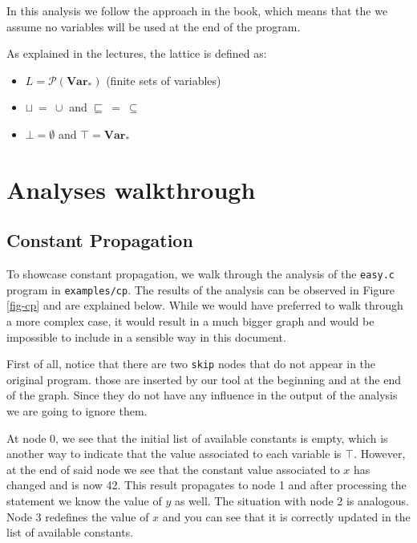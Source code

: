 \documentclass{article}
\begin{document}
In this analysis we follow the approach in the book, which means that the we assume no variables will be used at the end of the program.

As explained in the lectures, the lattice is defined as:

\begin{itemize}
	\item $L = \mathcal{P}(\mathbf{Var_*})$ (finite sets of variables)
	\item $\sqcup\ =\ \cup$ and $\sqsubseteq\ =\ \subseteq$
	\item $\bot = \emptyset$ and $\top = \mathbf{Var_*}$
\end{itemize}

\section{Analyses walkthrough}

\subsection*{Constant Propagation}

To showcase constant propagation, we walk through the analysis of the \texttt{easy.c} program in \texttt{examples/cp}. The results of the analysis can be observed in Figure \ref{fig-cp} and are explained below. While we would have preferred to walk through a more complex case, it would result in a much bigger graph and would be impossible to include in a sensible way in this document.

First of all, notice that there are two \texttt{skip} nodes that do not appear in the original program. those are inserted by our tool at the beginning and at the end of the graph. Since they do not have any influence in the output of the analysis we are going to ignore them.

At node 0, we see that the initial list of available constants is empty, which is another way to indicate that the value associated to each variable is $\top$. However, at the end of said node we see that the constant value associated to $x$ has changed and is now 42. This result propagates to node 1 and after processing the statement we know the value of $y$ as well. The situation with node 2 is analogous. Node 3 redefines the value of $x$ and you can see that it is correctly updated in the list of available constants.
\end{document}
